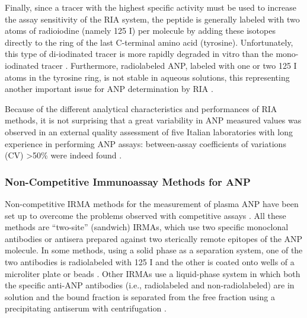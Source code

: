 \documentclass[14pt,a4paper,onecolumn]{extarticle}
\begin{document}
Finally, since a tracer with the highest specific activity must be used to increase the
assay sensitivity of the RIA system, the peptide is generally labeled with two atoms of
radioiodine (namely 125 I) per molecule by adding these isotopes directly to the ring of
the last C-terminal amino acid (tyrosine). Unfortunately, this type of di-iodinated tracer is more rapidly degraded in vitro than the mono-iodinated tracer \citep{bib22} \citep{bib233}. Furthermore,
radiolabeled ANP, labeled with one or two 125 I atoms in the tyrosine ring, is not stable
in aqueous solutions, this representing another important issue for ANP determination by RIA \citep{bib233}.

Because of the different analytical characteristics and performances of RIA methods,
it is not surprising that a great variability in ANP measured values was observed in an
external quality assessment of five Italian laboratories with long experience in performing
ANP assays: between-assay coefficients of variations (CV) >50\% were indeed found \citep{bib230}.

\subsubsection{ Non-Competitive Immunoassay Methods for ANP}
Non-competitive IRMA methods for the measurement of plasma ANP have been set up
to overcome the problems observed with competitive assays \citep{bib234} \citep{bib235} \citep{bib236} \citep{bib237}. All these methods
are “two-site” (sandwich) IRMAs, which use two specific monoclonal antibodies or antisera prepared against two sterically remote epitopes of the ANP molecule. In some methods, using a solid phase as a separation system, one of the two antibodies is radiolabeled
with 125 I and the other is coated onto wells of a microliter plate \citep{bib234} or beads \citep{bib236} \citep{bib237}. Other
IRMAs use a liquid-phase system in which both the specific anti-ANP antibodies (i.e., radiolabeled and non-radiolabeled) are in solution and the bound fraction is separated from
the free fraction using a precipitating antiserum with centrifugation \citep{bib235}.
\end{document}
